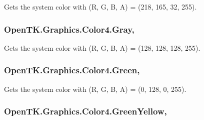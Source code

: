 Gets the system color with (R, G, B, A) = (218, 165, 32, 255). 

\hypertarget{struct_open_t_k_1_1_graphics_1_1_color4_ad926ba5fd3c7a1ba9af136499b06fce7}{
\subsubsection[{Gray}]{ Open\-T\-K.\-Graphics.\-Color4.\-Gray\hspace{0.3cm}{\ttfamily [static]}, {\ttfamily [get]}}}\label{struct_open_t_k_1_1_graphics_1_1_color4_ad926ba5fd3c7a1ba9af136499b06fce7}


Gets the system color with (R, G, B, A) = (128, 128, 128, 255). 

\hypertarget{struct_open_t_k_1_1_graphics_1_1_color4_a6218d5e5a075de66b52fc35b7fb6a752}{
\subsubsection[{Green}]{ Open\-T\-K.\-Graphics.\-Color4.\-Green\hspace{0.3cm}{\ttfamily [static]}, {\ttfamily [get]}}}\label{struct_open_t_k_1_1_graphics_1_1_color4_a6218d5e5a075de66b52fc35b7fb6a752}


Gets the system color with (R, G, B, A) = (0, 128, 0, 255). 

\hypertarget{struct_open_t_k_1_1_graphics_1_1_color4_a8ddea870315c44c91a088b15783591d8}{
\subsubsection[{Green\-Yellow}]{ Open\-T\-K.\-Graphics.\-Color4.\-Green\-Yellow\hspace{0.3cm}{\ttfamily [static]}, {\ttfamily [get]}}}\label{struct_open_t_k_1_1_graphics_1_1_color4_a8ddea870315c44c91a088b15783591d8}


